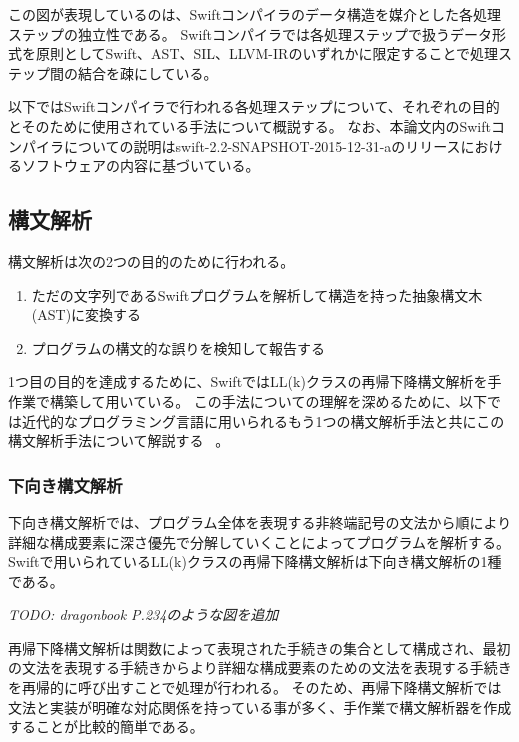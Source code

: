 この図が表現しているのは、Swiftコンパイラのデータ構造を媒介とした各処理ステップの独立性である。
Swiftコンパイラでは各処理ステップで扱うデータ形式を原則としてSwift、AST、SIL、LLVM-IRのいずれかに限定することで処理ステップ間の結合を疎にしている。

以下ではSwiftコンパイラで行われる各処理ステップについて、それぞれの目的とそのために使用されている手法について概説する。
なお、本論文内のSwiftコンパイラについての説明はswift-2.2-SNAPSHOT-2015-12-31-aのリリースにおけるソフトウェアの内容に基づいている。

\subsection{構文解析}
\label{refinement:structure:parser}

構文解析は次の2つの目的のために行われる。

\begin{enumerate}
    \item ただの文字列であるSwiftプログラムを解析して構造を持った抽象構文木(AST)に変換する
    \item プログラムの構文的な誤りを検知して報告する
\end{enumerate}

1つ目の目的を達成するために、SwiftではLL(k)クラスの再帰下降構文解析を手作業で構築して用いている。
この手法についての理解を深めるために、以下では近代的なプログラミング言語に用いられるもう1つの構文解析手法と共にこの構文解析手法について解説する ~\cite{dragonbook}。

\subsubsection{下向き構文解析}

下向き構文解析では、プログラム全体を表現する非終端記号の文法から順により詳細な構成要素に深さ優先で分解していくことによってプログラムを解析する。
Swiftで用いられているLL(k)クラスの再帰下降構文解析は下向き構文解析の1種である。

\vspace{2em}
{\sl\small{TODO: dragonbook P.234のような図を追加}}
\vspace{2em}

再帰下降構文解析は関数によって表現された手続きの集合として構成され、最初の文法を表現する手続きからより詳細な構成要素のための文法を表現する手続きを再帰的に呼び出すことで処理が行われる。
そのため、再帰下降構文解析では文法と実装が明確な対応関係を持っている事が多く、手作業で構文解析器を作成することが比較的簡単である。

